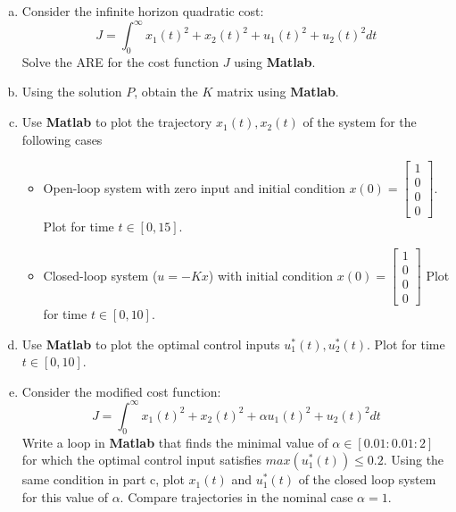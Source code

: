 \documentclass{article}
\begin{document}
\begin{enumerate}[a.]
\item Consider the infinite horizon quadratic cost:
$$ J = \int_0^\infty x_1(t)^2 + x_2(t)^2 + u_1(t)^2 + u_2(t)^2 dt $$
Solve the ARE for the cost function $J$ using \textbf{Matlab}.
\newline

\item Using the solution $P$, obtain the $K$ matrix using \textbf{Matlab}.
\newline

\item Use \textbf{Matlab} to plot the trajectory $x_1(t), x_2(t)$ of the system for the following cases

\begin{itemize}[$\bullet$]
\item Open-loop system with zero input and initial condition $x(0) = \begin{bmatrix} 1 \\ 0 \\ 0 \\ 0 \end{bmatrix}$.
Plot for time $ t \in [0, 15]$.
\newline

\item Closed-loop system ($u=-Kx$) with initial condition $x(0) = \begin{bmatrix} 1 \\ 0 \\ 0 \\ 0 \end{bmatrix}$
Plot for time $ t \in [0, 10]$.
\newline

\end{itemize}

\item Use \textbf{Matlab} to plot the optimal control inputs $u_1^*(t), u_2^*(t)$.
Plot for time $ t \in [0, 10]$.
\newline

\item Consider the modified cost function:
$$ J = \int_0^\infty x_1(t)^2 + x_2(t)^2 + \alpha u_1(t)^2 + u_2(t)^2 dt $$
Write a loop in \textbf{Matlab} that finds the minimal value of $\alpha \in [0.01:0.01:2]$ for which the optimal control input satisfies $max(u_1^*(t)) \leq 0.2$.
Using the same condition in part c, plot $x_1(t)$ and $u_1^*(t)$ of the closed loop system for this value of $\alpha$.
Compare trajectories in the nominal case $\alpha = 1$.
\newline

\end{enumerate}
\end{document}
